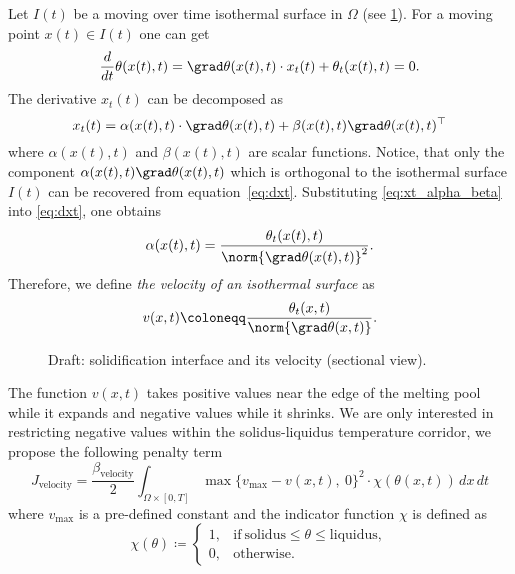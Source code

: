 Let $I(t)$ be a moving over time isothermal surface in $\Omega$ (see \cref{fig:velocity}). For a moving point $x(t) \in I(t)$ one can get
\begin{equation} \label{eq:dxt}
	\frac{d}{dt} \theta(x(t),t) = \grad \theta(x(t),t) \cdot x_t(t) + \theta_t(x(t),t) = 0.
\end{equation}
The derivative $x_t(t)$ can be decomposed as
\begin{equation} \label{eq:xt_alpha_beta}
	x_t(t) = \alpha(x(t),t) \cdot \grad \theta(x(t),t) + \beta(x(t),t) \grad \theta(x(t),t)^{\top}
\end{equation}
where $\alpha(x(t),t)$ and $\beta(x(t),t)$ are scalar functions. Notice, that only the component $\alpha(x(t),t) \grad \theta(x(t),t)$ which is orthogonal to the isothermal surface $I(t)$ can be recovered from equation~\eqref{eq:dxt}. Substituting \eqref{eq:xt_alpha_beta} into \eqref{eq:dxt}, one obtains
\begin{equation}
	\alpha(x(t),t) = \frac{\theta_t(x(t),t)}{\norm{\grad \theta(x(t),t)}^2}.
\end{equation}
Therefore, we define \emph{the velocity of an isothermal surface} as
\begin{equation}
	v(x,t) \coloneqq \frac{\theta_t(x,t)}{\norm{\grad \theta(x,t)}}.
\end{equation}


\begin{figure}
	\centering
	
	\caption{Draft: solidification interface and its velocity (sectional view).}
	\label{fig:velocity}
\end{figure}

The function $v(x,t)$ takes positive values near the edge of the melting pool while it expands and negative values while it shrinks. We are only interested in restricting negative values within the solidus-liquidus temperature corridor, we propose the following penalty term
\begin{equation}
	J_{\text{velocity}} = \frac{\beta_\text{velocity}}{2}
	\int_{\Omega \times [0,T]} \max \{ v_{\max} - v(x,t),\ 0 \}^2 \cdot \chi(\theta(x,t))\, dx\,dt
\end{equation}where $v_{\max}$ is a pre-defined constant and the indicator function $\chi$ is defined as
\begin{equation}
	\chi(\theta) \coloneqq \left\{
		\begin{array}{ll}
			1, & \text{if}\ \text{solidus} \le \theta \le \text{liquidus}, \\
			0, & \text{otherwise}.
		\end{array} \right.
\end{equation}


